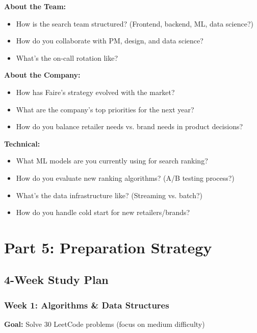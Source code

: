 \documentclass[11pt,letterpaper]{article}
\begin{document}
\textbf{About the Team:}
\begin{itemize}
    \item How is the search team structured? (Frontend, backend, ML, data science?)
    \item How do you collaborate with PM, design, and data science?
    \item What's the on-call rotation like?
\end{itemize}

\textbf{About the Company:}
\begin{itemize}
    \item How has Faire's strategy evolved with the market?
    \item What are the company's top priorities for the next year?
    \item How do you balance retailer needs vs. brand needs in product decisions?
\end{itemize}

\textbf{Technical:}
\begin{itemize}
    \item What ML models are you currently using for search ranking?
    \item How do you evaluate new ranking algorithms? (A/B testing process?)
    \item What's the data infrastructure like? (Streaming vs. batch?)
    \item How do you handle cold start for new retailers/brands?
\end{itemize}

\section{Part 5: Preparation Strategy}

\subsection{4-Week Study Plan}

\subsubsection{Week 1: Algorithms \& Data Structures}

\textbf{Goal:} Solve 30 LeetCode problems (focus on medium difficulty)
\end{document}
